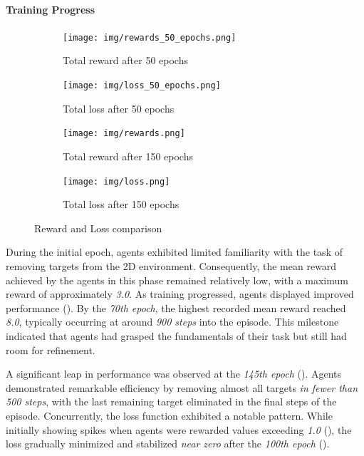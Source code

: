 \documentclass[12pt,a4paper,openright,twoside]{book}
\begin{document}
\paragraph{Training Progress}

\begin{figure}
  \centering
  \begin{subfigure}[b]{0.45\textwidth}
      \centering
      \texttt{[image: img/rewards\_50\_epochs.png]}
      \caption{Total reward after 50 epochs}
      \label{fig:g}
  \end{subfigure}
  \hfill
  \begin{subfigure}[b]{0.45\textwidth}
      \centering
      \texttt{[image: img/loss\_50\_epochs.png]}
      \caption{Total loss after 50 epochs}
      \label{fig:h}
  \end{subfigure}
  \hfill
  \begin{subfigure}[b]{0.45\textwidth}
      \centering
      \texttt{[image: img/rewards.png]}
      \caption{Total reward after 150 epochs} 
      \label{fig:i}
  \end{subfigure}
  \hfill
  \begin{subfigure}[b]{0.45\textwidth}
      \centering
      \texttt{[image: img/loss.png]}
      \caption{Total loss after 150 epochs} 
      \label{fig:l}
  \end{subfigure}
  \caption{Reward and Loss comparison}
  \label{fig:s}
\end{figure}

During the initial epoch, agents exhibited limited familiarity with the task of removing targets from the 2D environment. Consequently, the mean reward achieved by the agents in this phase remained relatively low, with a maximum reward of approximately \emph{3.0}. As training progressed, agents displayed improved performance (). By the \emph{70th epoch}, the highest recorded mean reward reached \emph{8.0}, typically occurring at around \emph{900 steps} into the episode. This milestone indicated that agents had grasped the fundamentals of their task but still had room for refinement.

A significant leap in performance was observed at the \emph{145th epoch} (). Agents demonstrated remarkable efficiency by removing almost all targets \emph{in fewer than 500 steps}, with the last remaining target eliminated in the final steps of the episode. Concurrently, the loss function exhibited a notable pattern. While initially showing spikes when agents were rewarded values exceeding \emph{1.0} (), the loss gradually minimized and stabilized \emph{near zero} after the \emph{100th epoch} ().
\end{document}
